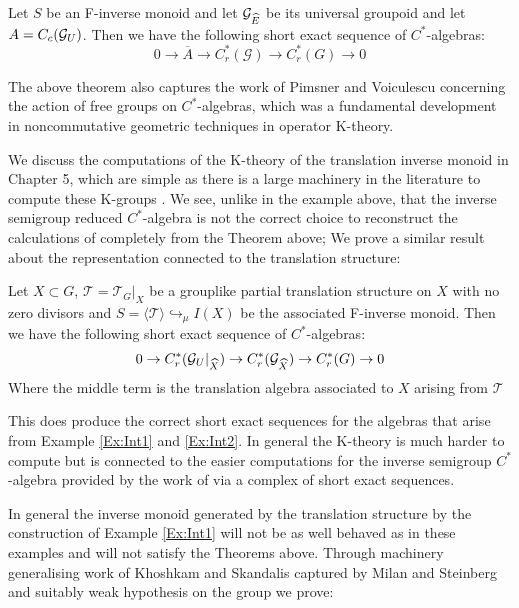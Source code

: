 \begin{thm}\label{Ex:Int3}
Let $S$ be an F-inverse monoid and let $\mathcal{G}_{\widehat{E}}$ be its universal groupoid and let $A=C_{c}(\mathcal{G}_{U})$. Then we have the following  short exact sequence of $C^{*}$-algebras:
\begin{equation*}
0 \rightarrow \overline{A} \rightarrow C^{*}_{r}(\mathcal{G}) \rightarrow C^{*}_{r}(G) \rightarrow 0
\end{equation*}
\end{thm}

The above theorem also captures the work of Pimsner and Voiculescu \cite{MR670181} concerning the action of free groups on $C^{*}$-algebras, which was a fundamental development in noncommutative geometric techniques in operator K-theory.

We discuss the computations of the K-theory of the translation inverse monoid in Chapter 5, which are simple as there is a large machinery in the literature to compute these K-groups \cite{Nor-2012,CEL-2}. We see, unlike in the example above, that the inverse semigroup reduced $C^{*}$-algebra is not the correct choice to reconstruct the calculations of \cite{MR670181} completely from the Theorem above; We prove a similar result about the representation connected to the translation structure:

\begin{thm}
Let $X \subset G$, $\mathcal{T}=\mathcal{T}_{G}|_{X}$ be a grouplike partial translation structure on $X$ with no zero divisors and $S=\langle \mathcal{T} \rangle \hookrightarrow_{\mu} I(X)$ be the associated F-inverse monoid. Then we have the following short exact sequence of $C^{*}$-algebras:
\begin{equation}\label{eqn1}
0 \rightarrow C^{*}_{r}(\mathcal{G}_{U}|_{\widehat{X}}) \rightarrow C^{*}_{r}(\mathcal{G}_{\widehat{X}}) \rightarrow C^{*}_{r}(G) \rightarrow 0
\end{equation}
Where the middle term is the translation algebra associated to $X$ arising from $\mathcal{T}$
\end{thm}

This does produce the correct short exact sequences for the algebras that arise from Example \ref{Ex:Int1} and \ref{Ex:Int2}. In general the K-theory is much harder to compute but is connected to the easier computations for the inverse semigroup $C^{*}$-algebra provided by the work of \cite{Nor-2012,CEL-2} via a complex of short exact sequences.

In general the inverse monoid generated by the translation structure by the construction of Example \ref{Ex:Int1} will not be as well behaved as in these examples and will not satisfy the Theorems above.
Through machinery generalising work of Khoshkam and Skandalis \cite{MR1900993} captured by Milan and Steinberg \cite{Milan-Steinberg} and suitably weak hypothesis on the group we prove:

